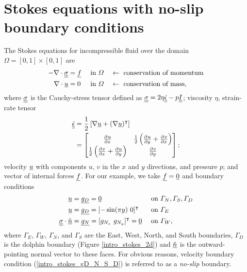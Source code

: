 
\section{Stokes equations with no-slip boundary conditions} \label{ssn_intro_stokes_2d}

The Stokes equations for incompressible fluid over the domain $\Omega = [0,1] \times [0,1]$ are
\begin{align}
  \label{intro_stokes_momentum}
  -\nabla \cdot \underline{\underline{\sigma}} &= \underline{f} &&\text{ in } \varOmega &&\leftarrow \text{ conservation of momentum} \\
  \label{intro_stokes_mass}
  \nabla \cdot \underline{u} &= 0 &&\text{ in } \varOmega &&\leftarrow \text{ conservation of mass},
\end{align}
where $\underline{\underline{\sigma}}$ is the Cauchy-stress tensor defined as $\underline{\underline{\sigma}} = 2\eta \underline{\underline{\dot{\epsilon}}} - p\underline{\underline{I}}$; viscosity $\eta$, strain-rate tensor
\begin{align}
  \label{intro_strain_rate_tensor}
  \underline{\underline{\dot{\epsilon}}} &= \frac{1}{2}\left[\nabla \underline{u} + (\nabla \underline{u})^\intercal \right] \notag \\
  &= \begin{bmatrix}
       \frac{\partial^{} u}{\partial x^{} } & \frac{1}{2} \left( \frac{\partial^{} u}{\partial y^{} } + \frac{\partial^{} v}{\partial x^{} } \right) \\
       \frac{1}{2} \left( \frac{\partial^{} v}{\partial x^{} } + \frac{\partial^{} u}{\partial y^{} } \right) & \frac{\partial^{} v}{\partial y^{} }
     \end{bmatrix};
\end{align}
velocity $\underline{u}$ with components $u$, $v$ in the $x$ and $y$ directions, and pressure $p$; and vector of internal forces $\underline{f}$.  For our example, we take $\underline{f}=\underline{0}$ and boundary conditions
\begin{align}
  \label{intro_stokes_gD_N_S_D}
  \rankone{u} &= \rankone{g_D} = \rankone{0} &&\text{ on } \Gamma_N, \Gamma_S, \Gamma_D \\
  \label{intro_stokes_gD_E}
  \rankone{u} &= \rankone{g_D} = [-\sin(\pi y)\ 0]\T &&\text{ on } \Gamma_E \\
  \label{intro_stokes_gN}
  \ranktwo{\sigma} \cdot \normal &= \rankone{g_N} = [g_{N_x}\ g_{N_y}]\T = \rankone{0} &&\text{ on } \Gamma_W,
\end{align}
where $\Gamma_E$, $\Gamma_W$, $\Gamma_N$, and $\Gamma_S$ are the East, West, North, and South boundaries, $\Gamma_D$ is the dolphin boundary (Figure \ref{intro_stokes_2d}) and $\underline{\hat{n}}$ is the outward-pointing normal vector to these faces. For obvious reasons, velocity boundary condition (\ref{intro_stokes_gD_N_S_D}) is referred to as a \emph{no-slip} boundary.


